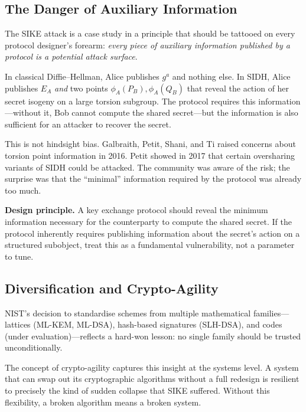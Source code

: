 \subsection{The Danger of Auxiliary Information}
\label{subsec:auxiliary-info}

The SIKE attack is a case study in a principle that should be tattooed on every protocol designer's forearm: \emph{every piece of auxiliary information published by a protocol is a potential attack surface}.

In classical Diffie--Hellman, Alice publishes $g^a$ and nothing else.  In SIDH, Alice publishes $E_A$ \emph{and} two points $\phi_A(P_B), \phi_A(Q_B)$ that reveal the action of her secret isogeny on a large torsion subgroup.  The protocol requires this information---without it, Bob cannot compute the shared secret---but the information is also sufficient for an attacker to recover the secret.

This is not hindsight bias.  Galbraith, Petit, Shani, and Ti raised concerns about torsion point information in 2016.  Petit showed in 2017 that certain oversharing variants of SIDH could be attacked.  The community was aware of the risk; the surprise was that the ``minimal'' information required by the protocol was already too much.

\begin{svgraybox}
\textbf{Design principle.}  A key exchange protocol should reveal the minimum information necessary for the counterparty to compute the shared secret.  If the protocol inherently requires publishing information about the secret's action on a structured subobject, treat this as a fundamental vulnerability, not a parameter to tune.
\end{svgraybox}


\subsection{Diversification and Crypto-Agility}
\label{subsec:diversification}

NIST's decision to standardise schemes from multiple mathematical families---lattices (ML-KEM, ML-DSA), hash-based signatures (SLH-DSA), and codes (under evaluation)---reflects a hard-won lesson: no single family should be trusted unconditionally.

The concept of crypto-agility captures this insight at the systems level.  A system that can swap out its cryptographic algorithms without a full redesign is resilient to precisely the kind of sudden collapse that SIKE suffered.  Without this flexibility, a broken algorithm means a broken system.

